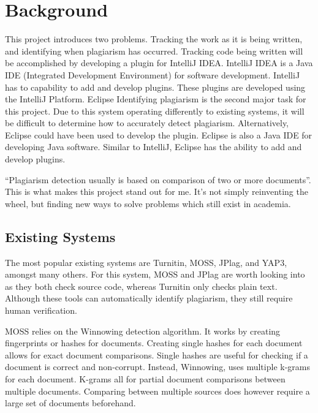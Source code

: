 \chapter{Background}
This project introduces two problems. Tracking the work as it is being written, and identifying when plagiarism has occurred. Tracking code being written will be accomplished by developing a plugin for IntelliJ IDEA. IntelliJ IDEA is a Java IDE (Integrated Development Environment) for software development. IntelliJ has to capability to add and develop plugins. These plugins are developed using the IntelliJ Platform\cite{IntelliJPlatform}. Eclipse  Identifying plagiarism is the second major task for this project. Due to this system operating differently to existing systems, it will be difficult to determine how to accurately detect plagiarism. Alternatively, Eclipse could have been used to develop the plugin. Eclipse is also a Java IDE for developing Java software. Similar to IntelliJ, Eclipse has the ability to add and develop plugins.

``Plagiarism detection usually is based on comparison of two or more documents''\cite{Lukashenko2007}. This is what makes this project stand out for me. It's not simply reinventing the wheel, but finding new ways to solve problems which still exist in academia. 

\section{Existing Systems}
\label{sec:existing-systems}
The most popular existing systems are Turnitin, MOSS, JPlag, and YAP3, amongst many others. For this system, MOSS and JPlag are worth looking into as they both check source code, whereas Turnitin only checks plain text\cite{Lukashenko2007}. Although these tools can automatically identify plagiarism, they still require human verification.

MOSS relies on the Winnowing detection algorithm. It works by creating fingerprints or hashes for documents\cite{Schleimer2003}. Creating single hashes for each document allows for exact document comparisons. Single hashes are useful for checking if a document is correct and non-corrupt. Instead, Winnowing, uses multiple k-grams for each document. K-grams all for partial document comparisons between multiple documents. Comparing between multiple sources does however require a large set of documents beforehand.

